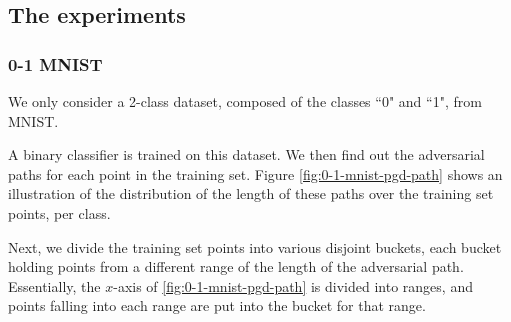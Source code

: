 \documentclass[12pt, oneside]{book}
\begin{document}
\subsection{The experiments}

\subsubsection{0-1 MNIST}
    We only consider a 2-class dataset, composed of the classes ``0" and ``1",
    from MNIST.

    A binary classifier is trained on this dataset. We then find out the
    adversarial paths for each point in the training set. Figure
    \ref{fig:0-1-mnist-pgd-path} shows an illustration of the distribution of
    the length of these paths over the training set points, per class.

    Next, we divide the training set points into various disjoint buckets, each
    bucket holding points from a different range of the length of the
    adversarial path. Essentially, the $x$-axis of \ref{fig:0-1-mnist-pgd-path}
    is divided into ranges, and points falling into each range are put into the
    bucket for that range.
\end{document}
